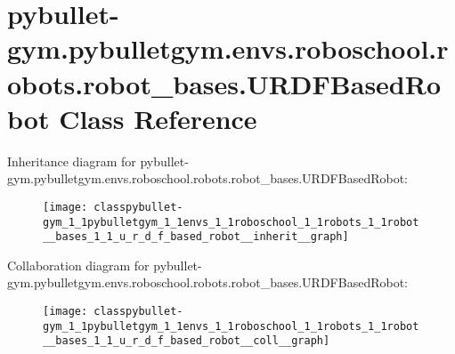 \hypertarget{classpybullet-gym_1_1pybulletgym_1_1envs_1_1roboschool_1_1robots_1_1robot__bases_1_1_u_r_d_f_based_robot}{}\section{pybullet-\/gym.pybulletgym.\+envs.\+roboschool.\+robots.\+robot\+\_\+bases.\+U\+R\+D\+F\+Based\+Robot Class Reference}
\label{classpybullet-gym_1_1pybulletgym_1_1envs_1_1roboschool_1_1robots_1_1robot__bases_1_1_u_r_d_f_based_robot}


Inheritance diagram for pybullet-\/gym.pybulletgym.\+envs.\+roboschool.\+robots.\+robot\+\_\+bases.\+U\+R\+D\+F\+Based\+Robot\+:
\nopagebreak
\begin{figure}[H]
\begin{center}
\leavevmode
\texttt{[image: classpybullet-gym\_1\_1pybulletgym\_1\_1envs\_1\_1roboschool\_1\_1robots\_1\_1robot\_\_bases\_1\_1\_u\_r\_d\_f\_based\_robot\_\_inherit\_\_graph]}
\end{center}
\end{figure}


Collaboration diagram for pybullet-\/gym.pybulletgym.\+envs.\+roboschool.\+robots.\+robot\+\_\+bases.\+U\+R\+D\+F\+Based\+Robot\+:
\nopagebreak
\begin{figure}[H]
\begin{center}
\leavevmode
\texttt{[image: classpybullet-gym\_1\_1pybulletgym\_1\_1envs\_1\_1roboschool\_1\_1robots\_1\_1robot\_\_bases\_1\_1\_u\_r\_d\_f\_based\_robot\_\_coll\_\_graph]}
\end{center}
\end{figure}
